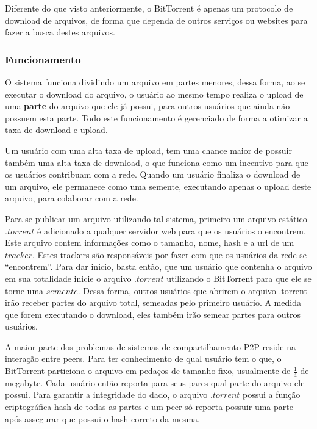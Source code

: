 \documentclass[a4paper]{article}
\begin{document}
Diferente do que visto anteriormente, o BitTorrent é apenas um protocolo de download de arquivos, de forma que dependa de outros serviços ou websites para fazer a busca destes arquivos\cite{pouwelsebit, CohenBIT}.

\subsubsection{Funcionamento}
O sistema funciona dividindo um arquivo em partes menores, dessa forma, ao se executar o download do arquivo, o usuário ao mesmo tempo realiza o upload de uma \textbf{parte} do arquivo que ele já possui, para outros usuários que ainda não possuem esta parte. Todo este funcionamento é gerenciado de forma a otimizar a taxa de download e upload. 

Um usuário com uma alta taxa de upload, tem uma chance maior de possuir também uma alta taxa de download, o que funciona como um incentivo para que os usuários contribuam com a rede. Quando um usuário finaliza o download de um arquivo, ele permanece como uma semente, executando apenas o upload deste arquivo, para colaborar com a rede. \cite{CohenBIT}

Para se publicar um arquivo utilizando tal sistema, primeiro um arquivo estático $.torrent$ é adicionado a qualquer servidor web para que os usuários o encontrem. Este arquivo contem informações como o tamanho, nome, hash e a url de um $tracker$.  Estes trackers são responsáveis por fazer com que os usuários da rede se ``encontrem''.  Para dar inicio, basta então, que um usuário que contenha o arquivo em sua totalidade inicie o arquivo $.torrent$ utilizando o BitTorrent para que ele se torne uma $semente$. Dessa forma, outros usuários que abrirem o arquivo .torrent irão receber partes do arquivo total, semeadas pelo primeiro usuário. A medida que forem executando o download, eles também irão semear partes para outros usuários.\cite{CohenBIT}

A maior parte dos problemas de sistemas de compartilhamento P2P reside na interação entre peers. Para ter conhecimento de qual usuário tem o que, o BitTorrent particiona o arquivo em pedaços de tamanho fixo, usualmente de $\frac{1}{4}$ de megabyte. Cada usuário então reporta para seus pares qual parte do arquivo ele possui. Para garantir a integridade do dado, o arquivo $.torrent$ possui a função criptográfica hash de todas as partes e um peer só reporta possuir uma parte após assegurar que possui o hash correto da mesma.\cite{CohenBIT}
\end{document}
